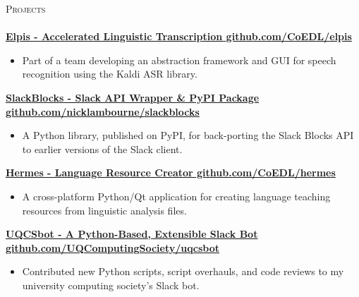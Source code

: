 \documentclass[a4paper]{article}
\newcommand{\lineunder} {
    \vspace*{-8pt} \\
    \hspace*{-10pt} \hrulefill \\
}
\newcommand{\header} [1] {
    {\hspace*{-10pt}\vspace*{6pt} \textsc{#1}}
    \vspace*{-6pt} \lineunder
}
\newenvironment{singleitem}
{   \small
    \vspace{0pt}
    \begin{itemize}
    \setlength{\itemsep}{0pt}
    \setlength{\parskip}{0pt}
    \setlength{\parsep}{0pt}   }
{\end{itemize} \vspace{1pt}	}
\begin{document}
\vspace{1mm}

\header{Projects}

\textbf{\href{https://github.com/CoEDL/elpis}{Elpis - Accelerated Linguistic Transcription \hfill github.com/CoEDL/elpis}}
\begin{singleitem}
	\item Part of a team developing an abstraction framework and GUI for speech recognition using the Kaldi ASR library.
\end{singleitem}

\textbf{\href{https://github.com/nicklambourne/slackblocks}{SlackBlocks - Slack API Wrapper \& PyPI Package \hfill github.com/nicklambourne/slackblocks}}
\begin{singleitem}
	\item A Python library, published on PyPI, for back-porting the Slack Blocks API to earlier versions of the Slack client.
\end{singleitem}

\textbf{\href{https://github.com/CoEDL/hermes}{Hermes - Language Resource Creator \hfill github.com/CoEDL/hermes}}
\begin{singleitem}
	\item A cross-platform Python/Qt application for creating language teaching resources from linguistic analysis files.
\end{singleitem}


\textbf{\href{https://github.com/UQComputingSociety/uqcsbot}{UQCSbot - A Python-Based, Extensible Slack Bot \hfill github.com/UQComputingSociety/uqcsbot}}
\begin{singleitem}
	\item Contributed new Python scripts, script overhauls, and code reviews to my university computing society's Slack bot.
\end{singleitem}



\end{document}
